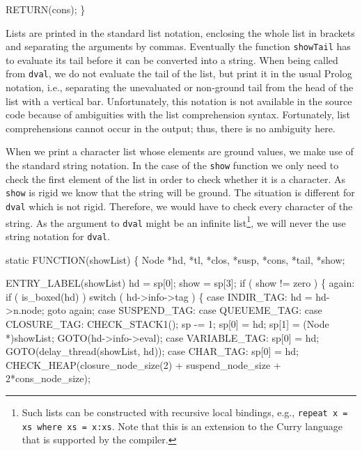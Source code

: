     RETURN(cons);
\}

\nwendcode{}\nwdocspar
Lists are printed in the standard list notation, enclosing the whole
list in brackets and separating the arguments by commas. Eventually
the function \texttt{showTail} has to evaluate its tail before it can
be converted into a string. When being called from \texttt{dval}, we do
not evaluate the tail of the list, but print it in the usual Prolog
notation, i.e., separating the unevaluated or non-ground tail from the
head of the list with a vertical bar. Unfortunately, this notation is
not available in the source code because of ambiguities with the list
comprehension syntax. Fortunately, list comprehensions cannot occur in
the output; thus, there is no ambiguity here.

When we print a character list whose elements are ground values, we
make use of the standard string notation. In the case of the
\texttt{show} function we only need to check the first element of the
list in order to check whether it is a character. As \texttt{show} is
rigid we know that the string will be ground. The situation is
different for \texttt{dval} which is not rigid. Therefore, we would
have to check every character of the string. As the argument to
\texttt{dval} might be an infinite list\footnote{Such lists can be
constructed with recursive local bindings, e.g., \texttt{repeat x = xs
where xs = x:xs}. Note that this is an extension to the Curry language
that is supported by the compiler.}, we will never the use string
notation for \texttt{dval}.

\nwenddocs{}\plusendmoddef\nwstartdeflinemarkup{}\nwenddeflinemarkup
static
FUNCTION(showList)
\{
    Node *hd, *tl, *clos, *susp, *cons, *tail, *show;

 ENTRY_LABEL(showList)
    hd = sp[0];
    show = sp[3];
    if ( show != zero )
    \{
    again:
        if ( is_boxed(hd) )
            switch ( hd->info->tag )
            \{
            case INDIR_TAG:
                hd = hd->n.node;
                goto again;
            case SUSPEND_TAG:
            case QUEUEME_TAG:
            case CLOSURE_TAG:
                CHECK_STACK1();
                sp -= 1;
                sp[0] = hd;
                sp[1] = (Node *)showList;
                GOTO(hd->info->eval);
            case VARIABLE_TAG:
                sp[0] = hd;
                GOTO(delay_thread(showList, hd));
            case CHAR_TAG:
                sp[0] = hd;
                CHECK_HEAP(closure_node_size(2) + suspend_node_size
                           + 2*cons_node_size);

